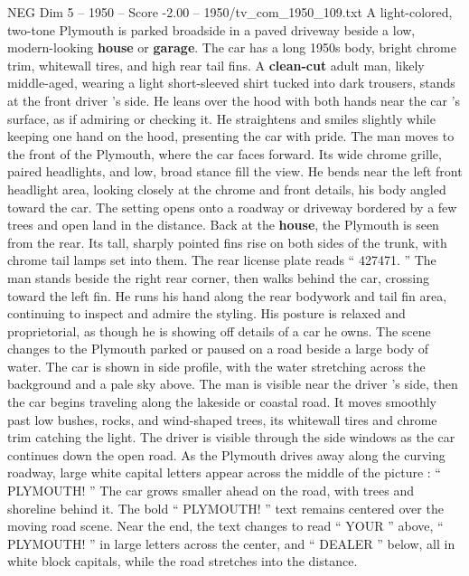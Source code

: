 \begin{textsample}{NEG Dim 5 – 1950 – Score -2.00 – 1950/tv\_com\_1950\_109.txt}  \label{ex:f5_neg_023}
A light-colored, two-tone Plymouth is parked broadside in a paved driveway beside a low, modern-looking \textbf{house} or \textbf{garage}.
The car has a long 1950s body, bright chrome trim, whitewall tires, and high rear tail fins.
A \textbf{clean-cut} adult man, likely middle-aged, wearing a light short-sleeved shirt tucked into dark trousers, stands at the front driver ’s side.
He leans over the hood with both hands near the car ’s surface, as if admiring or checking it.
He straightens and smiles slightly while keeping one hand on the hood, presenting the car with pride.
The man moves to the front of the Plymouth, where the car faces forward.
Its wide chrome grille, paired headlights, and low, broad stance fill the view.
He bends near the left front headlight area, looking closely at the chrome and front details, his body angled toward the car.
The setting opens onto a roadway or driveway bordered by a few trees and open land in the distance.
Back at the \textbf{house}, the Plymouth is seen from the rear.
Its tall, sharply pointed fins rise on both sides of the trunk, with chrome tail lamps set into them.
The rear license plate reads “ 427471. ” The man stands beside the right rear corner, then walks behind the car, crossing toward the left fin.
He runs his hand along the rear bodywork and tail fin area, continuing to inspect and admire the styling.
His posture is relaxed and proprietorial, as though he is showing off details of a car he owns.
The scene changes to the Plymouth parked or paused on a road beside a large body of water.
The car is shown in side profile, with the water stretching across the background and a pale sky above.
The man is visible near the driver ’s side, then the car begins traveling along the lakeside or coastal road.
It moves smoothly past low bushes, rocks, and wind-shaped trees, its whitewall tires and chrome trim catching the light.
The driver is visible through the side windows as the car continues down the open road.
As the Plymouth drives away along the curving roadway, large white capital letters appear across the middle of the picture : “ PLYMOUTH! ” The car grows smaller ahead on the road, with trees and shoreline behind it.
The bold “ PLYMOUTH! ” text remains centered over the moving road scene.
Near the end, the text changes to read “ YOUR ” above, “ PLYMOUTH! ” in large letters across the center, and “ DEALER ” below, all in white block capitals, while the road stretches into the distance.

\end{textsample}
